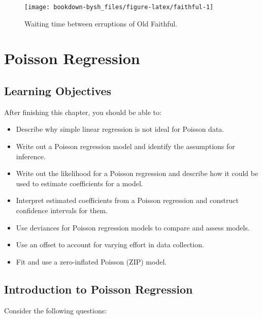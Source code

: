 \documentclass[
]{krantz}
\providecommand{\tightlist}{%
  \setlength{\itemsep}{0pt}\setlength{\parskip}{0pt}}
\begin{document}
\begin{figure}

{\centering \texttt{[image: bookdown-bysh\_files/figure-latex/faithful-1]} 

}

\caption{Waiting time between erruptions of Old Faithful.}\label{fig:faithful}
\end{figure}

\hypertarget{ch-poissonreg}{%
\chapter{Poisson Regression}\label{ch-poissonreg}}

\hypertarget{learning-objectives-3}{%
\section{Learning Objectives}\label{learning-objectives-3}}

After finishing this chapter, you should be able to:

\begin{itemize}
\tightlist
\item
  Describe why simple linear regression is not ideal for Poisson data.
\item
  Write out a Poisson regression model and identify the assumptions for inference.
\item
  Write out the likelihood for a Poisson regression and describe how it could be used to estimate coefficients for a model.
\item
  Interpret estimated coefficients from a Poisson regression and construct confidence intervals for them.
\item
  Use deviances for Poisson regression models to compare and assess models.
\item
  Use an offset to account for varying effort in data collection.
\item
  Fit and use a zero-inflated Poisson (ZIP) model.
\end{itemize}

\hypertarget{introduction-to-poisson-regression}{%
\section{Introduction to Poisson Regression}\label{introduction-to-poisson-regression}}

Consider the following questions:
\end{document}

